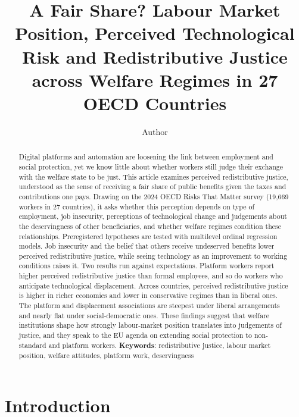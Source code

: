 \documentclass[
  12pt,
]{article}
\title{A Fair Share? Labour Market Position, Perceived Technological
Risk and Redistributive Justice across Welfare Regimes in 27 OECD
Countries}
\author{Author}
\affil{%
                  Affiliation
              }
\date{}
\begin{document}
\maketitle
\begin{abstract}
Digital platforms and automation are loosening the link between
employment and social protection, yet we know little about whether
workers still judge their exchange with the welfare state to be just.
This article examines perceived redistributive justice, understood as
the sense of receiving a fair share of public benefits given the taxes
and contributions one pays. Drawing on the 2024 OECD Risks That Matter
survey (19,669 workers in 27 countries), it asks whether this perception
depends on type of employment, job insecurity, perceptions of
technological change and judgements about the deservingness of other
beneficiaries, and whether welfare regimes condition these
relationships. Preregistered hypotheses are tested with multilevel
ordinal regression models. Job insecurity and the belief that others
receive undeserved benefits lower perceived redistributive justice,
while seeing technology as an improvement to working conditions raises
it. Two results run against expectations. Platform workers report higher
perceived redistributive justice than formal employees, and so do
workers who anticipate technological displacement. Across countries,
perceived redistributive justice is higher in richer economies and lower
in conservative regimes than in liberal ones. The platform and
displacement associations are steepest under liberal arrangements and
nearly flat under social-democratic ones. These findings suggest that
welfare institutions shape how strongly labour-market position
translates into judgements of justice, and they speak to the EU agenda
on extending social protection to non-standard and platform workers.
\newline \newline \textbf{Keywords}: redistributive justice, labour
market position, welfare attitudes, platform work, deservingness
\end{abstract}


\section{Introduction}\label{introduction}
\end{document}
